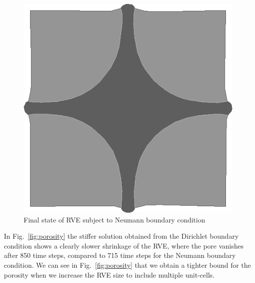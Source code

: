 \documentclass[notitlepage,a4paper,fleqn,9pt]{extarticle}
\newcommand{\figref}[1]{Fig.~\ref{#1}}
\begin{document}
\begin{multicols}{2}
\begin{figure}[H]
 \centering
 \includegraphics[scale=0.25]{figures/final_neumann}
 \caption{Final state of RVE subject to Neumann boundary condition}
 \label{fig:final_neumann}
\end{figure}

In \figref{fig:porosity} the stiffer solution obtained from the Dirichlet boundary condition shows a clearly slower shrinkage of the RVE, where the pore vanishes after 850 time steps, compared to 715 time steps for the Neumann boundary condition.
We can see in \figref{fig:porosity} that we obtain a tighter bound for the porosity when we increase the RVE size to include multiple unit-cells.

\begin{figure}[H]
 \centering
{}
\end{figure}
\end{multicols}
\end{document}
